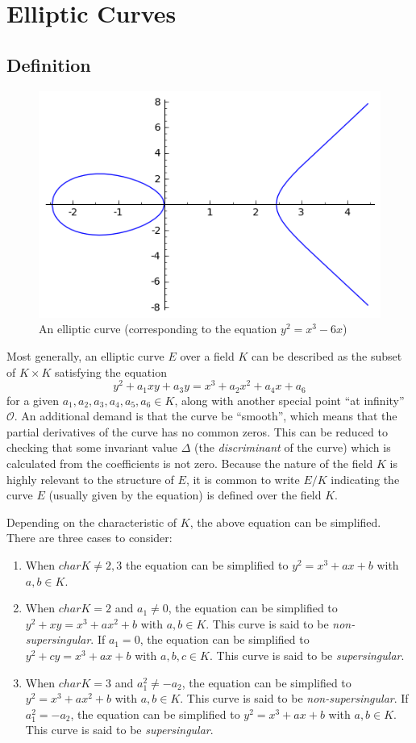 \documentclass[11pt,english]{article}
\begin{document}
\section{Elliptic Curves}
\subsection{Definition}
\begin{figure}
   \centering
   \includegraphics[scale = 0.5]{ec.png}
   \caption{An elliptic curve (corresponding to the equation $y^2=x^3-6x$)}
\end{figure}

Most generally, an elliptic curve $E$ over a field $K$ can be described as the subset of $K\times K$ satisfying the equation $$y^2+a_1xy+a_3y=x^3+a_2x^2+a_4x+a_6$$ 
for a given $a_1,a_2,a_3,a_4,a_5,a_6\in K$, along with another special point ``at infinity'' $\mathcal{O}$. An additional demand is that the curve be ``smooth'',
which means that the partial derivatives of the curve has no common zeros. This can be reduced to checking that some invariant value $\Delta$ (the \emph{discriminant} of the curve)
which is calculated from the coefficients is not zero. Because the nature of the field $K$ is highly relevant to the structure of $E$,
it is common to write $E/K$ indicating the curve $E$ (usually given by the equation) is defined over the field $K$.

Depending on the characteristic of $K$, the above equation can be simplified. There are three cases to consider:
\begin{enumerate}
  \item When $charK\ne 2,3$ the equation can be simplified to $y^2=x^3+ax+b$ with $a,b\in K$.
  \item When $charK = 2$ and $a_1 \ne 0$, the equation can be simplified to $y^2+xy=x^3+ax^2+b$ with $a,b\in K$. This curve is said to be \emph{non-supersingular}. If $a_1 = 0$, the equation can be simplified to $y^2+cy=x^3+ax+b$ with $a,b,c\in K$. This curve is said to be \emph{supersingular}.
  \item When $charK = 3$ and $a_1^2\ne -a_2$, the equation can be simplified to $y^2=x^3+ax^2+b$ with $a,b\in K$. This curve is said to be \emph{non-supersingular}. If $a_1^2=-a_2$, the equation can be simplified to $y^2=x^3+ax+b$ with $a,b\in K$. This curve is said to be \emph{supersingular}.
\end{enumerate}
\end{document}
